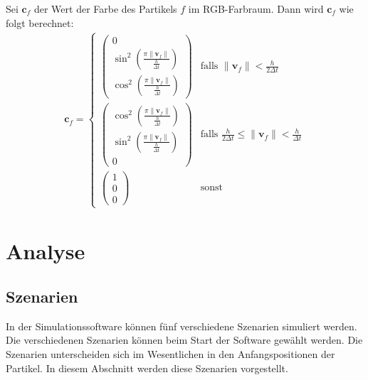 \documentclass[11pt,
a4paper,
parskip=half, %
BCOR=10mm, %
english,
ngerman]{scrreprt}
\begin{document}
Sei $\textbf{c}_f$ der Wert der Farbe des Partikels $f$ im RGB-Farbraum.
Dann wird $\textbf{c}_f$ wie folgt berechnet:
\begin{align}
    \textbf{c}_f = \begin{cases}
        \begin{pmatrix}
            0\\
            \sin^2(\frac{\pi \|\textbf{v}_f\|}{\frac{h}{\Delta t}})\\
            \cos^2(\frac{\pi \|\textbf{v}_f\|}{\frac{h}{\Delta t}})
        \end{pmatrix}
        & \text{falls } \|\textbf{v}_f\| < \frac{h}{2\Delta t}\\[25pt]
        \begin{pmatrix}
            \cos^2(\frac{\pi \|\textbf{v}_f\|}{\frac{h}{\Delta t}})\\
            \sin^2(\frac{\pi \|\textbf{v}_f\|}{\frac{h}{\Delta t}})\\
            0
        \end{pmatrix}
        & \text{falls } \frac{h}{2\Delta t} \leq \|\textbf{v}_f\| < \frac{h}{\Delta t}\\[25pt]
        \begin{pmatrix}
            1\\
            0\\
            0
        \end{pmatrix}
        & \text{sonst}
    \end{cases}
\end{align}



\chapter{Analyse}


\section{Szenarien}
In der Simulationssoftware können fünf verschiedene Szenarien simuliert werden.
Die verschiedenen Szenarien können beim Start der Software gewählt werden.
Die Szenarien unterscheiden sich im Wesentlichen in den Anfangspositionen der Partikel.
In diesem Abschnitt werden diese Szenarien vorgestellt.
\end{document}
